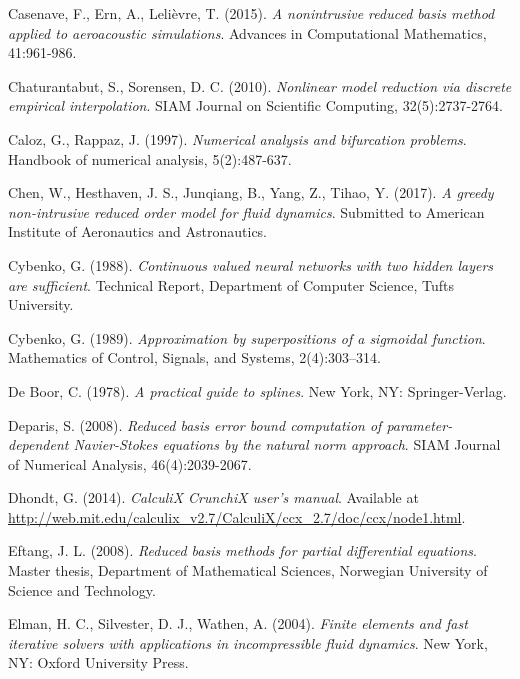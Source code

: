 \documentclass{elsarticle}
\theoremstyle{theorem}
\theoremstyle{definition}
\theoremstyle{remark}
\theoremstyle{proposition}
\numberwithin{figure}{section}
\begin{document}
\begin{thebibliography}{50}
		Casenave, F., Ern, A., Lelièvre, T. (2015). \emph{A nonintrusive reduced basis method applied to aeroacoustic simulations}. Advances in Computational Mathematics, 41:961-986.
		
		Chaturantabut, S., Sorensen, D. C. (2010). \emph{Nonlinear model reduction via discrete empirical interpolation}. SIAM Journal on Scientific Computing, 32(5):2737-2764.
		
		Caloz, G., Rappaz, J. (1997). \emph{Numerical analysis and bifurcation problems}. Handbook of numerical analysis, 5(2):487-637.
		
		Chen, W., Hesthaven, J. S., Junqiang, B., Yang, Z., Tihao, Y. (2017). \emph{A greedy non-intrusive reduced order model for fluid dynamics}. Submitted to American Institute of Aeronautics and Astronautics.
	
		Cybenko, G. (1988). \emph{Continuous valued neural networks with two hidden layers are sufficient}. Technical Report, Department of Computer Science, Tufts University.
		
		Cybenko, G. (1989). \emph{Approximation by superpositions of a sigmoidal function}. Mathematics of Control, Signals, and Systems, 2(4):303–314.
		
		De Boor, C. (1978). \emph{A practical guide to splines}. New York, NY: Springer-Verlag.
		
		
		Deparis, S. (2008). \emph{Reduced basis error bound computation of parameter-dependent Navier-Stokes equations by the natural norm approach}. SIAM Journal of Numerical Analysis, 46(4):2039-2067.
		
		Dhondt, G. (2014). \emph{CalculiX CrunchiX user's manual}. Available at \url{http://web.mit.edu/calculix_v2.7/CalculiX/ccx_2.7/doc/ccx/node1.html}.
		
		Eftang, J. L. (2008). \emph{Reduced basis methods for partial differential equations}. Master thesis, Department of Mathematical Sciences, Norwegian University of Science and Technology.
		
		Elman, H. C., Silvester, D. J., Wathen, A. (2004). \emph{Finite elements and fast iterative solvers with applications in incompressible fluid dynamics}. New York, NY: Oxford University Press.
		

\end{thebibliography}
\end{document}
